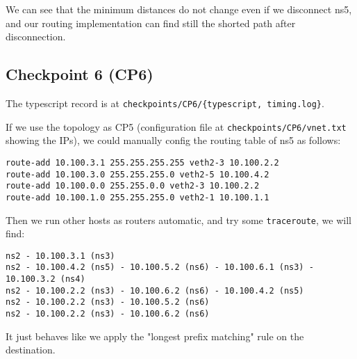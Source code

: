 \documentclass[a4paper]{article}
\begin{document}
  We can see that the minimum distances do not change even if we disconnect ns5, and our routing implementation can find still the shorted path after disconnection.

  \subsection{Checkpoint 6 (CP6)}

  The typescript record is at \texttt{checkpoints/CP6/\{typescript, timing.log\}}.

  If we use the topology as CP5 (configuration file at \texttt{checkpoints/CP6/vnet.txt} showing the IPs), we could manually config the routing table of ns5 as follows:
  \begin{verbatim}
route-add 10.100.3.1 255.255.255.255 veth2-3 10.100.2.2
route-add 10.100.3.0 255.255.255.0 veth2-5 10.100.4.2
route-add 10.100.0.0 255.255.0.0 veth2-3 10.100.2.2
route-add 10.100.1.0 255.255.255.0 veth2-1 10.100.1.1
  \end{verbatim}

  Then we run other hosts as routers automatic, and try some \texttt{traceroute}, we will find:
\begin{verbatim}
ns2 - 10.100.3.1 (ns3)
ns2 - 10.100.4.2 (ns5) - 10.100.5.2 (ns6) - 10.100.6.1 (ns3) - 10.100.3.2 (ns4)
ns2 - 10.100.2.2 (ns3) - 10.100.6.2 (ns6) - 10.100.4.2 (ns5)
ns2 - 10.100.2.2 (ns3) - 10.100.5.2 (ns6)
ns2 - 10.100.2.2 (ns3) - 10.100.6.2 (ns6)
\end{verbatim}
  It just behaves like we apply the "longest prefix matching" rule on the destination.
\end{document}
